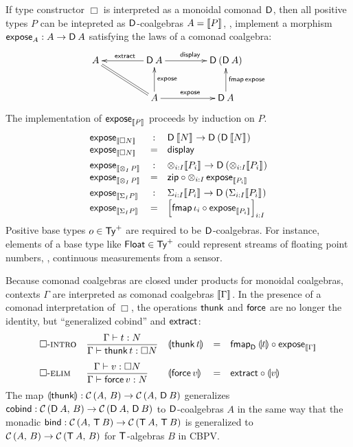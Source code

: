 \documentclass[acmsmall,review,anonymous]{acmart}\settopmatter{printfolios=true,printccs=false,printacmref=false}
\begin{document}
If type constructor $\Box$ is interpreted as a monoidal comonad $\D$,
then all positive types $P$ can be intepreted as $\D$-coalgebras
$A = \den P$, \ie, implement a morphism $\expose[A] : A \to \D\,A$
satisfying the laws of a comonad coalgebra:
\[
\xymatrix@C=10ex{
A  \ar@{=}[dr]
  & \D\,A \ar[l]_{\textract} \ar[r]^{\tdisplay}
  & \D\,(\D\,A)
\\
  & A \ar[u]_{\texpose} \ar[r]^{\texpose}
  & \D\,A \ar[u]_{\tfmap\,\texpose}
}
\]
The implementation of $\expose[\den P]$ proceeds by induction on $P$.
\[
\begin{array}{lcl}
  \expose[\den{\Box N}] & : & {\D\,\den N} \to {\D\,(\D\,\den N)} \\
  \expose[\den{\Box N}] & = & \display
\\[1ex]
  \expose[\den{\tupt I P}] & : & \tupt {i:I} {\den{P_i}} \to \D\,(\tupt {i:I} {\den{P_i}}) \\
  \expose[\den{\tupt I P}] & = & \tzip \comp \tupt {i:I} \expose[\den{P_i}]
\\[1ex]
  \expose[\den{\sumt I P}] & : & \sumt {i:I} {\den{P_i}} \to \D\,(\sumt {i:I} {\den{P_i}}) \\
  \expose[\den{\sumt I P}] & = & \left[\tfmap\,\iota_i \comp \expose[\den{P_i}]\right]_{i:I} \\
\end{array}
\]
Positive base types $o \in \PTy$ are required to be $\D$-coalgebras.
For instance, elements of a base type like
$\Float \in \PTy$ could represent streams of floating point numbers,
\eg, continuous measurements from a sensor.

Because comonad coalgebras are closed under products for monoidal
coalgebras, contexts $\Gamma$ are interpreted as comonad coalgebras
$\den\Gamma$.  In the presence of a comonad interpretation of $\Box$,
the operations $\tthunk$ and $\tforce$ are no longer the identity, but
``generalized cobind'' and $\extract$:
\[
\begin{array}{lllcl}
 \rintro\Box
  & \ru{\oCompTy \Gamma t N
      }{\ValTy \Gamma {\thunk t} {\Box N}}
  & \dent{\thunk t} & = & \fmap[\D]{\dent t} \comp \expose[\den\Gamma]
\\[3ex]
 \relim\Box
  & \ru{\ValTy \Gamma v {\Box N}
      }{\oCompTy \Gamma {\force v} N}
  & \dent{\force v} & = & \textract \comp \dent v
\end{array}
\]
The map $\dent\tthunk : \Hom A B \to \Hom A {\D\,B}$ generalizes
$\tcobind : \Hom{\D\,A} B \to \Hom{\D\,A}{\D\,B}$ to $\D$-coalgebras
$A$ in the same way that the monadic
$\tbind : \Hom{A}{\T\,B} \to \Hom{\T\,A}{\T\,B}$ is generalized to
$\Hom{A}{B} \to \Hom{\T\,A}{B}$ for $\T$-algebras $B$ in CBPV.
\end{document}
